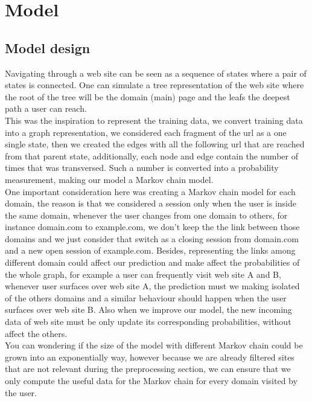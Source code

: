 \section{Model}\label{sec:models}

\subsection{Model design}\label{subsec:model_design}

Navigating through a web site can be seen as a sequence of states where a pair of states is connected. One can simulate a tree representation of the web site where the root of the tree will be the domain (main) page and the leafs the deepest path a user can reach.
\\[2ex]
This was the inspiration to represent the training data, we convert training data into a graph representation, we considered each fragment of the url as a one single state, then we created the edges with all the following url that are reached from that parent state, additionally, each node and edge contain the number of times that was transversed.  Such a number is converted into a probability measurement, making our model a Markov chain model.
\\[2ex]
One important consideration here was creating a Markov chain model for each domain, the reason is that we considered a session only when the user is inside the same domain, whenever the user changes from one domain to others, for instance domain.com to example.com, we don’t keep the the link between those domains and we just consider that switch as a closing session from domain.com and a new open session of example.com. Besides, representing the links among different domain could affect our prediction and make affect the probabilities of the whole graph, for example a user can frequently visit web site A and B, whenever user surfaces over web site A, the prediction must we making isolated of the others domains and a similar behaviour should happen when the user surfaces over web site B. Also when we improve our model, the new incoming data of web site must be only update its corresponding probabilities, without affect the others.
\\[2ex]
You can wondering if the size of the model with different Markov chain could be grown into an exponentially way, however because we are already filtered sites that are not relevant during the preprocessing section, we can ensure that we only compute the useful data for the Markov chain for every domain visited by the user.

